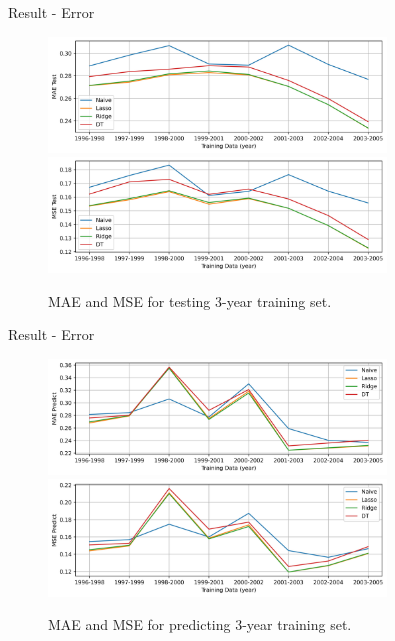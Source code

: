 \documentclass{beamer}
\begin{document}
\begin{frame}{Result - Error}

  \begin{figure}[H]
    \centering
    \includegraphics[width=0.8\textwidth]{../Result/Res-3_MAE_test.jpg} \\
    \includegraphics[width=0.8\textwidth]{../Result/Res-3_MSE_test.jpg}
    \caption{MAE and MSE for testing 3-year training set.}
  \end{figure}

\end{frame}

\begin{frame}{Result - Error}

  \begin{figure}[H]
    \centering
    \includegraphics[width=0.8\textwidth]{../Result/Res-3_MAE_pred.jpg} \\
    \includegraphics[width=0.8\textwidth]{../Result/Res-3_MSE_pred.jpg}
    \caption{MAE and MSE for predicting 3-year training set.}
  \end{figure}

\end{frame}
\end{document}

